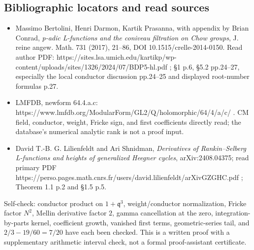\subsection{Bibliographic locators and read
sources}\label{bibliographic-locators-and-read-sources}

\begin{itemize}
\tightlist
\item
  Massimo Bertolini, Henri Darmon, Kartik Prasanna, with appendix by
  Brian Conrad, \emph{p-adic L-functions and the coniveau filtration on
  Chow groups}, J. reine angew. Math. 731 (2017), 21--86, DOI
  10.1515/crelle-2014-0150. Read author PDF:
  https://sites.lsa.umich.edu/kartikp/wp-content/uploads/sites/1326/2024/07/BDP5-hl.pdf
  ; §1 p.6, §5.2 pp.24--27, especially the local conductor discussion
  pp.24--25 and displayed root-number formulas p.27.
\item
  LMFDB, newform 64.4.a.c:
  https://www.lmfdb.org/ModularForm/GL2/Q/holomorphic/64/4/a/c/ . CM
  field, conductor, weight, Fricke sign, and first coefficients directly
  read; the database's numerical analytic rank is not a proof input.
\item
  David T.-B. G. Lilienfeldt and Ari Shnidman, \emph{Derivatives of
  Rankin--Selberg L-functions and heights of generalized Heegner
  cycles}, arXiv:2408.04375; read primary PDF
  https://perso.pages.math.cnrs.fr/users/david.lilienfeldt/arXivGZGHC.pdf
  ; Theorem 1.1 p.2 and §1.5 p.5.
\end{itemize}

Self-check: conductor product on \(1+\mathfrak q^3\), weight/conductor
normalization, Fricke factor \(N^2\), Mellin derivative factor \(2\),
gamma cancellation at the zero, integration-by-parts kernel, coefficient
growth, vanished first terms, geometric-series tail, and
\(2/3-19/60=7/20\) have each been checked. This is a written proof with
a supplementary arithmetic interval check, not a formal proof-assistant
certificate.
